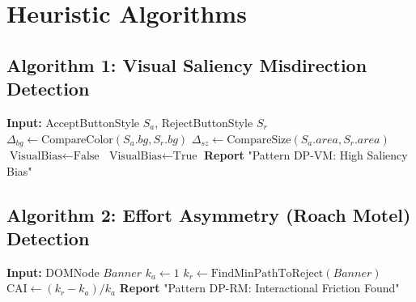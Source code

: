 \documentclass[12pt]{article}
\begin{document}
\section{Heuristic Algorithms}

\subsection{Algorithm 1: Visual Saliency Misdirection Detection}
\begin{algorithm}
\caption{Detection of Visual Misdirection (DP-VM)}
\begin{algorithmic}[1]
\State \textbf{Input:} AcceptButtonStyle $S_a$, RejectButtonStyle $S_r$
\State $\Delta_{bg} \gets \text{CompareColor}(S_a.bg, S_r.bg)$
\State $\Delta_{sz} \gets \text{CompareSize}(S_a.area, S_r.area)$
\State $\text{VisualBias} \gets \text{False}$
    \State $\text{VisualBias} \gets \text{True}$
    \State \textbf{Report} "Pattern DP-VM: High Saliency Bias"
\EndIf
\end{algorithmic}
\end{algorithm}

\subsection{Algorithm 2: Effort Asymmetry (Roach Motel) Detection}
\begin{algorithm}
\caption{Detection of Roach Motel (DP-RM)}
\begin{algorithmic}[1]
\State \textbf{Input:} DOMNode $Banner$
\State $k_a \gets 1$ 
\State $k_r \gets \text{FindMinPathToReject}(Banner)$
    \State $\text{CAI} \gets (k_r - k_a) / k_a$
    \State \textbf{Report} "Pattern DP-RM: Interactional Friction Found"
\EndIf
\end{algorithmic}
\end{algorithm}
\end{document}

